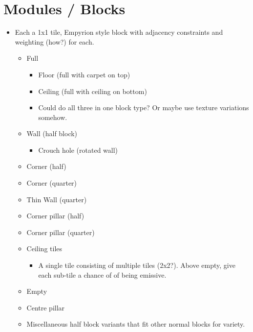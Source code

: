 \section*{Modules / Blocks}
\begin{itemize}
    \item Each a 1x1 tile, Empyrion style block with adjacency constraints and weighting (how?) for each.
    \begin{itemize}
        \item Full
        \begin{itemize}
            \item Floor (full with carpet on top)
            \item Ceiling (full with ceiling on bottom)
            \item Could do all three in one block type? Or maybe use texture variations somehow.
        \end{itemize}
        \item Wall (half block)
        \begin{itemize}
            \item Crouch hole (rotated wall)
        \end{itemize}
        \item Corner (half)
        \item Corner (quarter)
        \item Thin Wall (quarter)
        \item Corner pillar (half)
        \item Corner pillar (quarter)
        \item Ceiling tiles
        \begin{itemize}
            \item A single tile consisting of multiple tiles (2x2?). Above empty, give each sub-tile a chance of of being emissive.
        \end{itemize}
        \item Empty
        \item Centre pillar
        \item Miscellaneous half block variants that fit other normal blocks for variety.
    \end{itemize}
\end{itemize}

